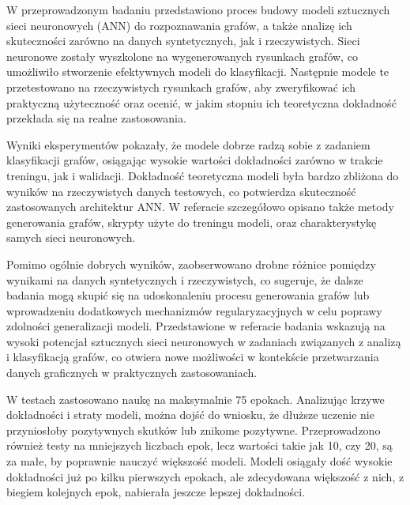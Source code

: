 
W przeprowadzonym badaniu przedstawiono proces budowy modeli sztucznych sieci neuronowych (ANN) do rozpoznawania grafów,
a także analizę ich skuteczności zarówno na danych syntetycznych, jak i rzeczywistych.
Sieci neuronowe zostały wyszkolone na wygenerowanych rysunkach grafów,
co umożliwiło stworzenie efektywnych modeli do klasyfikacji.
Następnie modele te przetestowano na rzeczywistych rysunkach grafów,
aby zweryfikować ich praktyczną użyteczność oraz ocenić,
w jakim stopniu ich teoretyczna dokładność przekłada się na realne zastosowania.

Wyniki eksperymentów pokazały, że modele dobrze radzą sobie z zadaniem klasyfikacji grafów,
osiągając wysokie wartości dokładności zarówno w trakcie treningu, jak i walidacji.
Dokładność teoretyczna modeli była bardzo zbliżona do wyników na rzeczywistych danych testowych,
co potwierdza skuteczność zastosowanych architektur ANN.
W referacie szczegółowo opisano także metody generowania grafów,
skrypty użyte do treningu modeli, oraz charakterystykę samych sieci neuronowych.

Pomimo ogólnie dobrych wyników,
zaobserwowano drobne różnice pomiędzy wynikami na danych syntetycznych i rzeczywistych,
co sugeruje, że dalsze badania mogą skupić się na udoskonaleniu procesu generowania grafów
lub wprowadzeniu dodatkowych mechanizmów regularyzacyjnych w celu poprawy zdolności generalizacji modeli.
Przedstawione w referacie badania wskazują na wysoki potencjał sztucznych sieci neuronowych
w zadaniach związanych z analizą i klasyfikacją grafów,
co otwiera nowe możliwości w kontekście przetwarzania danych graficznych w praktycznych zastosowaniach.

W testach zastosowano naukę na maksymalnie 75 epokach.
Analizując krzywe dokładności i straty modeli, można dojść do wniosku,
że dłuższe uczenie nie przyniosłoby pozytywnych skutków lub znikome pozytywne.
Przeprowadzono również testy na mniejszych liczbach epok, lecz wartości takie jak 10, czy 20,
są za małe, by poprawnie nauczyć większość modeli.
Modeli osiągały dość wysokie dokładności już po kilku pierwszych epokach,
ale zdecydowana większość z nich, z biegiem kolejnych epok, nabierała jeszcze lepszej dokładności.

